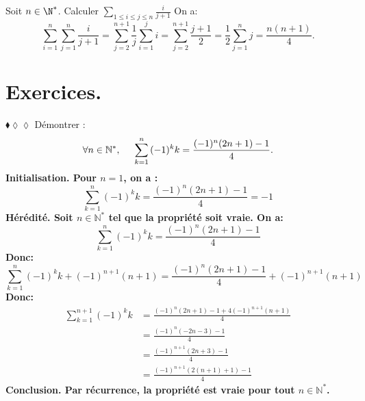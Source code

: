 \documentclass[11pt]{article}
\begin{document}
\begin{ex}{}{}
    Soit $n\in\N^*$. Calculer $\sum\limits_{1\leq i\leq j\leq n}\frac{i}{j+1}$
    \tcblower
    On a:
    \begin{equation*}
        \sum_{i=1}^n\sum_{j=1}^n\frac{i}{j+1}=\sum_{j=2}^{n+1}\frac{1}{j}\sum_{i=1}^ji=\sum_{j=2}^{n+1}\frac{j+1}{2}=\frac{1}{2}\sum_{j=1}^nj=\frac{n(n+1)}{4}.
    \end{equation*}
\end{ex}

\section{Exercices.}

\begin{exercice}{$\blacklozenge\lozenge\lozenge$}{}
    Démontrer :
    \begin{equation*}
        \forall{n}\in\mathbb{N}^*,\hspace{0.5cm} \sum\limits^{n}_{k=1}{(-1)^kk} = \frac{(-1)^n(2n+1)-1}{4}.
    \end{equation*}
    \tcblower
    \bf{Initialisation.} Pour $n=1$, on a :
    \begin{equation*}
        \sum\limits^{n}_{k=1}{(-1)^kk} = \frac{(-1)^n(2n+1)-1}{4} = -1
    \end{equation*}
    \bf{Hérédité.} Soit $n\in\mathbb{N}^*$ tel que la propriété soit vraie. On a:
    \begin{equation*}
        \sum\limits^{n}_{k=1}{(-1)^kk} = \frac{(-1)^n(2n+1)-1}{4}
    \end{equation*}
    Donc:
    \begin{equation*}
        \sum\limits^{n}_{k=1}{(-1)^kk} + (-1)^{n+1}(n+1) = \frac{(-1)^n(2n+1)-1}{4} +(-1)^{n+1}(n+1)
    \end{equation*}
    Donc:
    \begin{equation*}
        \begin{aligned}
            \sum\limits^{n+1}_{k=1}(-1)^kk 
            &= \frac{(-1)^n(2n+1)-1+4(-1)^{n+1}(n+1)}{4}\\
            &=\frac{(-1)^n(-2n - 3)-1}{4}\\
            &=\frac{(-1)^{n+1}(2n+3)-1}{4}\\
            &=\frac{(-1)^{n+1}(2(n+1)+1)-1}{4}
        \end{aligned}
    \end{equation*}
    \bf{Conclusion.} Par récurrence, la propriété est vraie pour tout $n\in\mathbb{N}^*$.
\end{exercice}
\end{document}
